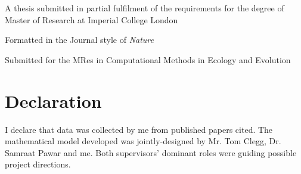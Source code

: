 \documentclass[../thesis.tex]{subfiles} %
\begin{document}
\maketitle
\vspace{15cm}
\begin{center}
    A thesis submitted in partial fulfilment of the requirements for the degree of Master of Research at Imperial College London
    
    Formatted in the Journal style of \textit{Nature}
    
    Submitted for the MRes in Computational Methods in Ecology and Evolution
\end{center}
\clearpage

\section{Declaration}
I declare that data was collected by me from published papers cited.  The mathematical model developed was jointly-designed by Mr. Tom Clegg, Dr. Samraat Pawar and me.  Both supervisors' dominant roles were guiding possible project directions.
\tableofcontents
\listoffigures
\listoftables
\end{document}
